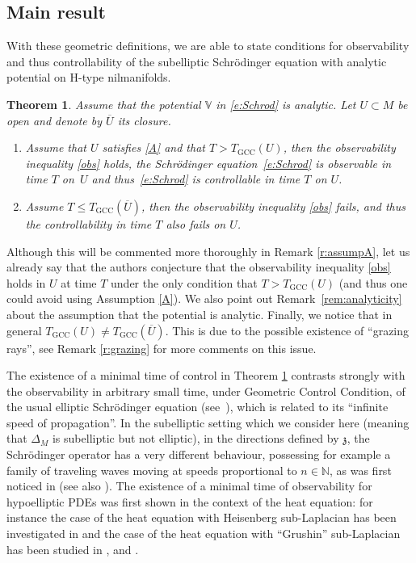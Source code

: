 \documentclass[JEP,XML,SOM,Unicode,published]{cedram}
\newcommand{\GCC}{\mathrm{GCC}}
\theoremstyle{plain}
\newtheorem{theorem}{Theorem}[section]
\theoremstyle{definition}
\def\N{{\mathbb N}}
\def\bbV{{\mathbb V}}
\begin{document}
\subsection{Main result} \label{s:mainresfkl}

With these geometric definitions, we are able to state conditions for observability and thus controllability of the subelliptic Schrödinger equation with analytic potential on H-type nilmanifolds.

\begin{theorem}\label{t:main} Assume that the potential $\bbV$ in \eqref{e:Schrod} is analytic. Let $U\subset M$ be open and denote by $\overline{U}$ its closure.
\begin{enumerate}
\item Assume that $U$ satisfies \eqref{A} and that $T> T_\GCC(U)$, then the observability inequality \eqref{obs} holds, \ie the Schrödinger equation~\eqref{e:Schrod} is observable in time $T$ on~$U$ and thus~\eqref{e:Schrod} is controllable in time $T$ on $U$.
\item Assume $T\leq T_\GCC(\overline{U})$, then the observability inequality \eqref{obs} fails, and thus the controllability in time $T$ also fails on $U$.
\end{enumerate}
\end{theorem}

Although this will be commented more thoroughly in Remark \ref{r:assumpA}, let us already say that the authors conjecture that the observability inequality \eqref{obs} holds in $U$ at time $T$ under the only condition that $T>T_\GCC(U)$ (and thus one could avoid using Assumption \eqref{A}). We also point out Remark~\ref{rem:analyticity} about the assumption that the potential is analytic. Finally, we notice that in general $T_\GCC(U)\neq T_\GCC(\overline{U})$. This is due to the possible existence of ``grazing rays'', see Remark \ref{r:grazing} for more comments on this issue.

The existence of a minimal time of control in Theorem \ref{t:main} contrasts strongly with the observability in arbitrary small time, under Geometric Control Condition, of the usual elliptic Schrödinger equation (see~\cite{Leb}), which is related to its ``infinite speed of propagation''. In the subelliptic setting which we consider here (meaning that $\Delta_M$ is subelliptic but not elliptic), in the directions defined by $\mathfrak z$, the Schrödinger operator has a very different behaviour, possessing for example a family of traveling waves moving at speeds proportional to $n\in\N$, as was first noticed in \cite[\S 1]{BGX} (see also \cite[Th.\,2.10]{FF}). The existence of a minimal time of observability for hypoelliptic PDEs was first shown in the context of the heat equation: for instance the case of the heat equation with Heisenberg sub-Laplacian has been investigated in \cite{BC} and the case of the heat equation with ``Grushin'' sub-Laplacian has been studied in \cite{Koe}, \cite{DK} and \cite{BDE}.
\end{document}
